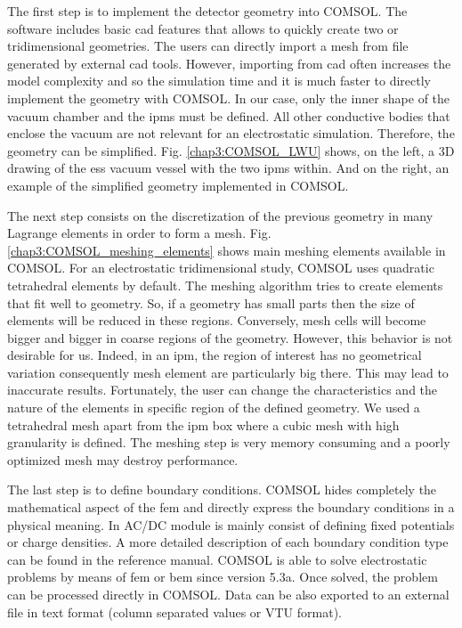 \begin{refsection}
	The first step is to implement the detector geometry into COMSOL. The software includes basic \acrshort{cad} features that allows to quickly create two or tridimensional geometries. The users can directly import a mesh from file generated by external \acrshort{cad} tools. However, importing from \acrshort{cad} often increases the model complexity and so the simulation time and it is much faster to directly implement the geometry with COMSOL.  In our case, only the inner shape of the vacuum chamber and the \acrshort{ipm}s must be defined. All other conductive bodies that enclose the vacuum are not relevant for an electrostatic simulation. Therefore, the geometry can be simplified. Fig. \ref{chap3:COMSOL_LWU} shows, on the left, a 3D drawing of the \acrshort{ess} vacuum vessel with the two \acrshort{ipm}s within. And on the right, an example of the simplified geometry implemented in COMSOL.

	

	The next step consists on the discretization of the previous geometry in many Lagrange elements in order to form a mesh. Fig. \ref{chap3:COMSOL_meshing_elements} shows main meshing elements available in COMSOL. For an electrostatic tridimensional study, COMSOL uses quadratic tetrahedral elements by default. The meshing algorithm tries to create elements that fit well to geometry. So, if a geometry has small parts then the size of elements will be reduced in these regions. Conversely, mesh cells will become bigger and bigger in coarse regions of the geometry. However, this behavior is not desirable for us. Indeed, in an \acrshort{ipm}, the region of interest has no geometrical variation consequently mesh element are particularly big there. This may lead to inaccurate results. Fortunately, the user can change the characteristics and the nature of the elements in specific region of the defined geometry. We used a tetrahedral mesh apart from the \acrshort{ipm} box where a cubic mesh with high granularity is defined. The meshing step is very memory consuming and a poorly optimized mesh may destroy performance.

	

	The last step is to define boundary conditions. COMSOL hides completely the mathematical aspect of the \acrshort{fem} and directly express the boundary conditions in a physical meaning. In AC/DC module is mainly consist of defining fixed potentials or charge densities. A more detailed description of each boundary condition type can be found in the reference manual. COMSOL is able to solve electrostatic problems by means of \acrshort{fem} or \acrshort{bem} since version 5.3a.
	Once solved, the problem can be processed directly in COMSOL. Data can be also exported to an external file in text format (column separated values or VTU format).


\end{refsection}
